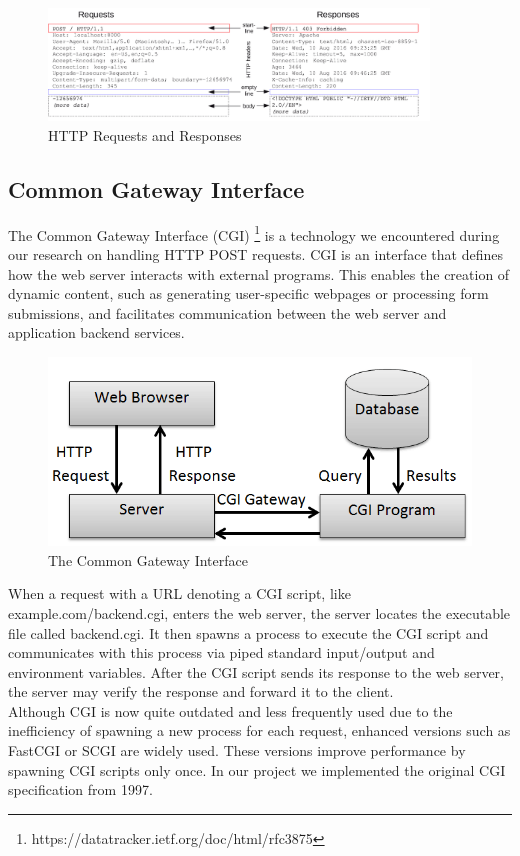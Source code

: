 \begin{figure}[h]
	\centering
	\includegraphics[width=0.9\textwidth]{figures/http_structure.png}
	\caption{HTTP Requests and Responses}
\end{figure} %

\subsection*{Common Gateway Interface}
The Common Gateway Interface (CGI) \footnote{https://datatracker.ietf.org/doc/html/rfc3875} is a technology we encountered during our research on handling HTTP POST requests. CGI is an interface that defines how the web server interacts with external programs. This enables the creation of dynamic content, such as generating user-specific webpages or processing form submissions, and facilitates communication between the web server and application backend services.

\begin{figure}[h]
	\centering
	\includegraphics[width=\textwidth]{figures/Common-Gateway-Interface.png}
	\caption{The Common Gateway Interface}
\end{figure}

When a request with a URL denoting a CGI script, like example.com/backend.cgi, enters the web server, the server locates the executable file called backend.cgi. It then spawns a process to execute the CGI script and communicates with this process via piped standard input/output and environment variables. After the CGI script sends its response to the web server, the server may verify the response and forward it to the client.\\

Although CGI is now quite outdated and less frequently used due to the inefficiency of spawning a new process for each request, enhanced versions such as FastCGI or SCGI are widely used. These versions improve performance by spawning CGI scripts only once. In our project we implemented the original CGI specification from 1997.

